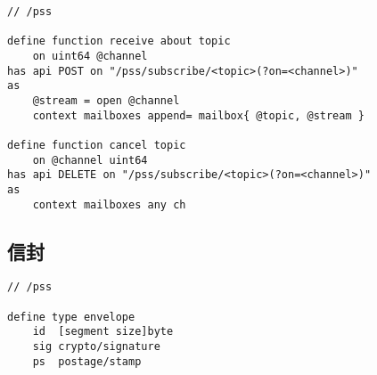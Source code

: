 \begin{definition}\label{def:receive}
\begin{lstlisting}[language=buzz1]
// /pss

define function receive about topic 
    on uint64 @channel
has api POST on "/pss/subscribe/<topic>(?on=<channel>)"
as 
    @stream = open @channel
    context mailboxes append= mailbox{ @topic, @stream }
    
define function cancel topic
    on @channel uint64
has api DELETE on "/pss/subscribe/<topic>(?on=<channel>)"
as
    context mailboxes any ch
\end{lstlisting}
\end{definition}

\subsection{信封}

\begin{definition}[Envelope]\label{def:pss-envelope}
\begin{lstlisting}[language=buzz1]
// /pss

define type envelope
    id  [segment size]byte
    sig crypto/signature
    ps  postage/stamp   
    
\end{lstlisting}
\end{definition}
